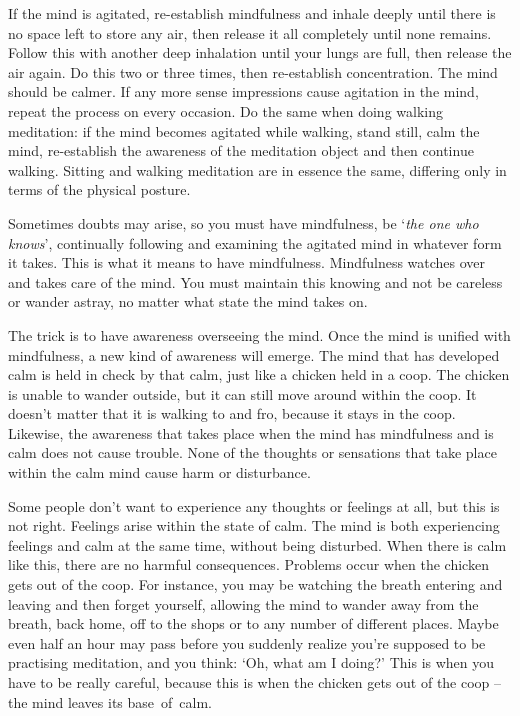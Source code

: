 If the mind is agitated, re-establish mindfulness and inhale deeply until there is no space left to store any air, then release it all completely until none remains. Follow this with another deep inhalation until your lungs are full, then release the air again. Do this two or three times, then re-establish concentration. The mind should be calmer. If any more sense impressions cause agitation in the mind, repeat the process on every occasion. Do the same when doing walking meditation: if the mind becomes agitated while walking, stand still, calm the mind, re-establish the awareness of the meditation object and then continue walking. Sitting and walking meditation are in essence the same, differing only in terms of the physical posture.

Sometimes doubts may arise, so you must have mindfulness, be `\textit{the one who knows}', continually following and examining the agitated mind in whatever form it takes. This is what it means to have mindfulness. Mindfulness watches over and takes care of the mind. You must maintain this knowing and not be careless or wander astray, no matter what state the mind takes on.

The trick is to have awareness overseeing the mind. Once the mind is unified with mindfulness, a new kind of awareness will emerge. The mind that has developed calm is held in check by that calm, just like a chicken held in a coop. The chicken is unable to wander outside, but it can still move around within the coop. It doesn't matter that it is walking to and fro, because it stays in the coop. Likewise, the awareness that takes place when the mind has mindfulness and is calm does not cause trouble. None of the thoughts or sensations that take place within the calm mind cause harm or disturbance.

Some people don't want to experience any thoughts or feelings at all, but this is not right. Feelings arise within the state of calm. The mind is both experiencing feelings and calm at the same time, without being disturbed. When there is calm like this, there are no harmful consequences. Problems occur when the chicken gets out of the coop. For instance, you may be watching the breath entering and leaving and then forget yourself, allowing the mind to wander away from the breath, back home, off to the shops or to any number of different places. Maybe even half an hour may pass before you suddenly realize you're supposed to be practising meditation, and you think: `Oh, what am I doing?' This is when you have to be really careful, because this is when the chicken gets out of the coop -- the mind leaves its base~of~calm.

